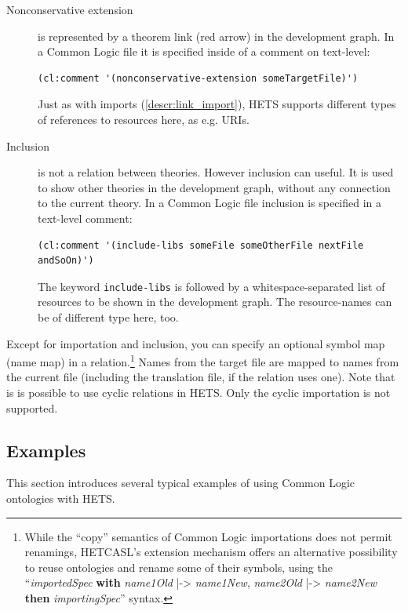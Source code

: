 \documentclass{article}
\newcommand{\normalTEXTSC}[2]{{#1\scriptsize#2}}
\newcommand     {\Hets}{\normalTEXTSC{H}{ETS}\xspace}
\newcommand{\HetCASL}{\normalTEXTSC{H}{ET}\normalTEXTSC{C}{ASL}\xspace}
\begin{document}
\begin{description}
\item[Nonconservative extension]
  is represented by a theorem link (red arrow) in the development graph. In a 
  Common Logic file it is specified inside of a comment on text-level:
  
  \begin{lstlisting}[language=clif]
(cl:comment '(nonconservative-extension someTargetFile)')
  \end{lstlisting}
  Just as with imports (\ref{descr:link_import}), \Hets supports different types 
  of references to resources here, as e.g. URIs.
  

\item[Inclusion]
  is not a relation between theories. However inclusion can useful. It is used 
  to show other theories in the development graph, without any connection 
  to the current theory. In a Common Logic file inclusion is specified in a 
  text-level comment:
  \begin{lstlisting}[language=clif]
(cl:comment '(include-libs someFile someOtherFile nextFile andSoOn)')
  \end{lstlisting}
  The keyword \texttt{include-libs} is followed by a whitespace-separated list 
  of resources to be shown in the development graph. The resource-names can be 
  of different type here, too.
\end{description}

Except for importation and inclusion, you can specify an optional symbol map 
(name map) in a relation.\footnote{While the ``copy'' semantics of Common Logic importations does not permit renamings, \HetCASL's extension mechanism offers an alternative possibility to reuse ontologies and rename some of their symbols, using the ``\textit{importedSpec} \textbf{with} \textit{name1Old} |-> \textit{name1New}, \textit{name2Old} |-> \textit{name2New} \textbf{then} \textit{importingSpec}'' syntax.}
 Names from the target file are mapped to names from the current 
file (including the translation file, if the relation uses one).  Note that is is possible to use cyclic relations in \Hets. Only the cyclic 
importation is not supported.

\subsection{Examples}
\label{sec:examples}

This section introduces several typical examples of using Common Logic ontologies with \Hets.
\end{document}
